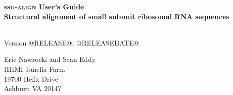 \begin{titlepage}
{\Large

\vspace*{\fill}


\begin{center}
{\Huge \textbf{\textsc{ssu-align} User's Guide}}\\
{\large \textbf{Structural alignment of small subunit ribosomal RNA
    sequences}}\\
\end{center}

\vspace*{\fill}

\begin{center}
\textsl{}\\
Version @RELEASE@; @RELEASEDATE@ \\ 

\vspace*{\fill}

Eric Nawrocki and Sean Eddy\\
HHMI Janelia Farm\\
19700 Helix Drive\\
Ashburn VA 20147\\
\textsl{} \\
\end{center}

\vspace*{\fill}

}
\end{titlepage}
